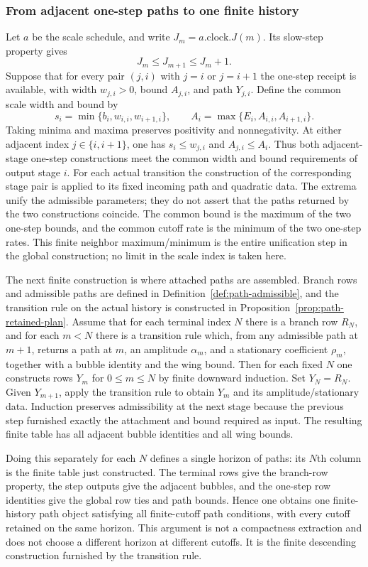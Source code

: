 \subsubsection{From adjacent one-step paths to one finite history}

Let $a$ be the scale schedule, and write $J_m=a.\mathrm{clock}.J(m)$. Its
slow-step property gives
\[
 J_m\leq J_{m+1}\leq J_m+1.
\]
Suppose that for every pair $(j,i)$ with $j=i$ or $j=i+1$ the one-step
receipt is available, with width $w_{j,i}>0$, bound $A_{j,i}$, and path
$Y_{j,i}$. Define the common scale width and bound by
\[
 s_i=\min\{b_i,w_{i,i},w_{i+1,i}\},\qquad
 A_i=\max\{E_i,A_{i,i},A_{i+1,i}\}.
\]
Taking minima and maxima preserves positivity and nonnegativity. At either
adjacent index $j\in\{i,i+1\}$, one has $s_i\leq w_{j,i}$ and
$A_{j,i}\leq A_i$. Thus both adjacent-stage one-step constructions meet
the common width and bound requirements of output stage $i$. For each
actual transition the construction of the corresponding stage pair is
applied to its fixed incoming path and quadratic data. The extrema
unify the admissible parameters; they do not assert that the paths
returned by the two constructions coincide. The common bound is the
maximum of the two one-step bounds, and
the common cutoff rate is the minimum of the two one-step rates. This finite
neighbor maximum/minimum is the entire unification step in the global
construction; no limit in the scale index is taken here.

The next finite construction is where attached paths are assembled.
Branch rows and admissible paths are defined in
Definition~\ref{def:path-admissible}, and the transition rule on the actual
history is constructed in Proposition~\ref{prop:path-retained-plan}. Assume
that for each terminal index $N$ there is a branch row $R_N$, and for each
$m<N$ there is a transition rule which, from any admissible path at $m+1$,
returns a path at $m$, an amplitude $\alpha_m$, and a stationary coefficient
$\rho_m$, together with a bubble identity and the wing bound. Then for each
fixed $N$ one constructs rows $Y_m$ for $0\leq m\leq N$ by finite downward
induction. Set $Y_N=R_N$. Given $Y_{m+1}$, apply the transition rule to obtain
$Y_m$ and its amplitude/stationary data. Induction preserves admissibility
at the next stage because the previous step furnished exactly the attachment
and bound required as input. The resulting finite table has all adjacent
bubble identities and all wing bounds.

Doing this separately for each $N$ defines a single horizon of paths: its
$N$th column is the finite table just constructed. The terminal rows give the
branch-row property, the step outputs give the adjacent bubbles, and the
one-step row identities give the global row ties and path bounds. Hence one
obtains one finite-history path object satisfying all finite-cutoff path
conditions, with every cutoff retained on the same horizon. This argument is not a compactness extraction
and does not choose a different horizon at different cutoffs. It is the
finite descending construction furnished by the transition rule.

